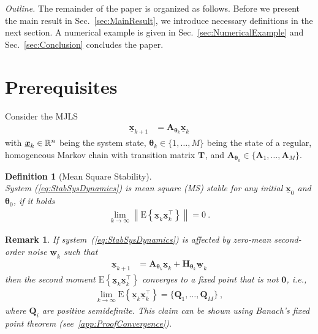\documentclass[preprint,1p,11pt]{IR-Template/ISAS_IR}
\newcommand{\rv}[1]{\ensuremath{{\boldsymbol{#1}}}}
\newcommand{\rvec}[1]{\ensuremath{{\boldsymbol{\underline{#1}}}}}
\newcommand{\mat}[1]{{\ensuremath{{\mathbf{#1}}}}}
\newcommand{\tr}{^{\top}}
\newcommand{\expect}[1]{\mathrm{E}\left\lbrace #1 \right\rbrace}
\newcommand{\zeromatrix}{\mat{0}}
\newcommand{\Asys}[1]{\mat{A}_{#1}}
\newcommand{\Qsys}[1]{\mat{Q}_{#1}}
\newcommand{\Hsys}[1]{\mat{H}_{#1}}
\newcommand{\xsys}[1]{\rvec{x}_{#1}}
\newcommand{\wsys}[1]{\rvec{w}_{#1}}
\newcommand{\mode}[1]{\rv{\theta}_{#1}}
\newcommand{\TransitionMatrix}[1]{\mat{T}_{#1}}
\newcommand{\NumModes}{M}
\newtheorem{remark}{Remark}
\newtheorem{definition}{Definition}
\begin{document}
\emph{Outline.} The remainder of the paper is organized as follows. Before we present the main result in Sec.~\ref{sec:MainResult}, we introduce necessary definitions in the next section. A numerical example is given in Sec.~\ref{sec:NumericalExample} and Sec.~\ref{sec:Conclusion} concludes the paper.
    
   \section{Prerequisites}
   	\label{sec:Definitions}
   	Consider the MJLS 
\begin{align}
\xsys{k+1}
	&=
	\Asys{\mode{k}}\xsys{k}
\label{eq:StabSysDynamics}
\end{align}
with $\xsys{k}\in\IR^n$ being the system state, $\mode{k}\in\{1,\dots,\NumModes\}$ being the state of a regular, homogeneous Markov chain with transition matrix $\TransitionMatrix{}$, and $\Asys{\mode{k}}\in\{\Asys{1},\dots,\Asys{\NumModes}\}$.
\begin{definition}[Mean Square Stability]\hfill\\
System (\ref{eq:StabSysDynamics}) is mean square (MS) stable for any initial $\xsys{0}$ and $\mode{0}$, if it holds
\begin{align*}
\lim\limits_{k\rightarrow\infty} \left\|\expect{\xsys{k}\xsys{k}\tr}\right\| = 0\ .
\end{align*}
\label{def:MSS}
\end{definition}

\begin{remark}
If system~(\ref{eq:StabSysDynamics}) is affected by zero-mean second-order noise $\wsys{k}$ such that
\begin{align*}
\xsys{k+1}
	&=
	\Asys{\mode{k}}\xsys{k} + \Hsys{\mode{k}}\wsys{k}
\end{align*}
then the second moment $\expect{\xsys{k}\xsys{k}\tr}$ converges to a fixed point that is not $\zeromatrix$, i.e.,
\begin{align*}
\lim\limits_{k\rightarrow\infty} \expect{\xsys{k}\xsys{k}\tr} = \{\Qsys{1},\dots,\Qsys{\NumModes}\}\ ,
\end{align*}
where $\Qsys{i}$ are positive semidefinite. This claim can be shown using Banach's fixed point theorem (see~\ref{app:ProofConvergence}).
\end{remark}
\end{document}
